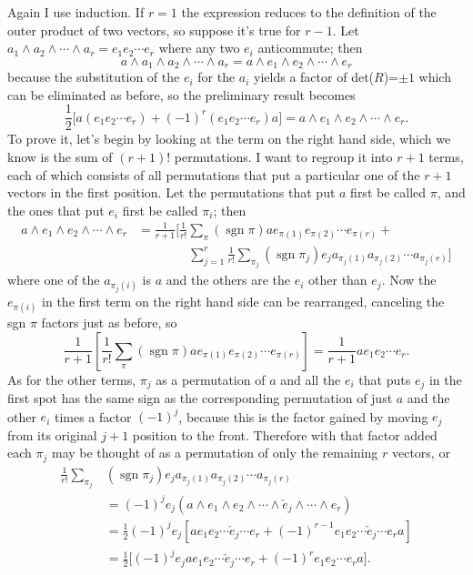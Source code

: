 \documentclass{utarticle}
\DeclareMathOperator{\out}{\wedge}
\newcommand{\half}{\ensuremath{\frac{1}{2}}}
\DeclareMathOperator{\sgn}{sgn}
\begin{document}
Again I use induction.  If $r=1$ the expression reduces to the
definition of the outer product of two vectors, so suppose it's true
for $r-1$.  Let $a_1 \out a_2 \out \dotsb \out a_r = e_1 e_2
\dotsb e_r$ where any two $e_i$ anticommute; then
\begin{equation}
a \out a_1 \out a_2 \out \dotsb \out a_r = 
a \out e_1 \out e_2 \out \dotsb \out e_r
\end{equation}
because the substitution of the $e_i$ for the $a_i$ yields a factor of
det($R$)=$\pm 1$ which can be eliminated as before, so the preliminary 
result becomes
\begin{equation}
\half\big[a (e_1 e_2 \dotsb e_r) + (-1)^r (e_1 e_2 \dotsb e_r) a\big] = 
         a \out e_1 \out e_2 \out \dotsb \out e_r.
\end{equation}
To prove it, let's begin by looking at the term on the right hand side, which we
know is the sum of $(r+1)!$ permutations.  I want to regroup it into
$r+1$ terms, each of which consists of all permutations that put a
particular one of the $r+1$ vectors in the first position.  Let the
permutations that put $a$ first be called $\pi$, and the ones that put
$e_i$ first be called $\pi_i$; then
\begin{align}
a \out e_1 \out e_2 \out \dotsb \out e_r  & =  
       \frac{1}{r+1} \Bigg[ \frac{1}{r!} \sum_{\pi} (\sgn\pi) a e_{\pi(1)}
       e_{\pi(2)} \dotsb e_{\pi(r)} + \nonumber \\
 & \qquad \qquad \sum_{j=1}^r \frac{1}{r!} \sum_{\pi_j} (\sgn\pi_j) e_j 
       a_{\pi_j(1)} a_{\pi_j(2)} \dotsb a_{\pi_j(r)} \Bigg]
\end{align}
where one of the $a_{\pi_j(i)}$ is $a$ and the others are the $e_i$
other than $e_j$.  Now the $e_{\pi(i)}$ in the first term on the right
hand side can be rearranged, canceling the sgn $\pi$ factors just as
before, so
\begin{equation}
\frac{1}{r+1} \left[ \frac{1}{r!} \sum_{\pi} (\sgn\pi) a e_{\pi(1)}
       e_{\pi(2)} \dotsb e_{\pi(r)} \right] = \frac{1}{r+1} a e_1 e_2 \dotsb e_r.
\end{equation}
As for the other terms, $\pi_j$ as a permutation of $a$ and all the
$e_i$ that puts $e_j$ in the first spot has the same sign as the
corresponding permutation of just $a$ and the other $e_i$ times a
factor $(-1)^j$, because this is the factor gained by moving $e_j$
from its original $j+1$ position to the front.  Therefore with that
factor added each $\pi_j$ may be thought of as a permutation of only
the remaining $r$ vectors, or
\begin{align}
\frac{1}{r!} \sum_{\pi_j} & (\sgn\pi_j) e_j a_{\pi_j(1)} a_{\pi_j(2)} 
             \dotsb a_{\pi_j(r)} \nonumber \\
 & = (-1)^j e_j (a \out e_1 \out e_2 \out \dotsb \out \check{e}_j 
     \out \dotsb \out e_r) \nonumber \\
 & = \half (-1)^j e_j [a e_1 e_2 \dotsb \check{e}_j \dotsb e_r + (-1)^{r-1} 
     e_1 e_2 \dotsb \check{e}_j \dotsb e_r a] \nonumber \\
 & = \half \big[(-1)^j e_j a e_1 e_2 \dotsb \check{e}_j \dotsb e_r + 
              (-1)^r e_1 e_2 \dotsb e_r a\big].
\end{align}
\end{document}
